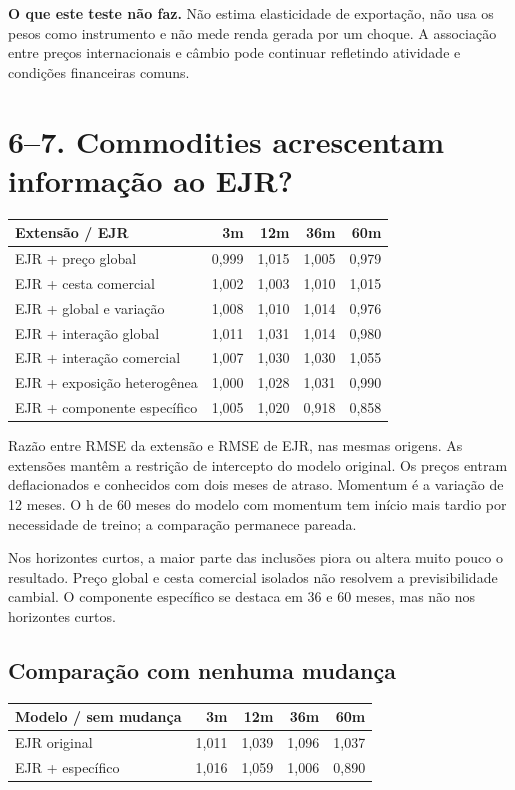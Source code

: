 \documentclass[11pt,a4paper]{article}
\begin{document}
\textbf{O que este teste não faz.} Não estima elasticidade de exportação, não usa os pesos como instrumento e não mede renda gerada por um choque. A associação entre preços internacionais e câmbio pode continuar refletindo atividade e condições financeiras comuns.

\clearpage
\section*{6--7. Commodities acrescentam informação ao EJR?}\small\begin{center}\begin{tabular}{lrrrr}\toprule
Extensão / EJR & 3m & 12m & 36m & 60m \\ \midrule
EJR + preço global & 0,999 & 1,015 & 1,005 & 0,979 \\
EJR + cesta comercial & 1,002 & 1,003 & 1,010 & 1,015 \\
EJR + global e variação & 1,008 & 1,010 & 1,014 & 0,976 \\
EJR + interação global & 1,011 & 1,031 & 1,014 & 0,980 \\
EJR + interação comercial & 1,007 & 1,030 & 1,030 & 1,055 \\
EJR + exposição heterogênea & 1,000 & 1,028 & 1,031 & 0,990 \\
EJR + componente específico & 1,005 & 1,020 & 0,918 & 0,858 \\
\bottomrule\end{tabular}\end{center}\normalsize

Razão entre RMSE da extensão e RMSE de EJR, nas mesmas origens. As extensões mantêm a restrição de intercepto do modelo original. Os preços entram deflacionados e conhecidos com dois meses de atraso. Momentum é a variação de 12 meses. O h de 60 meses do modelo com momentum tem início mais tardio por necessidade de treino; a comparação permanece pareada.

Nos horizontes curtos, a maior parte das inclusões piora ou altera muito pouco o resultado. Preço global e cesta comercial isolados não resolvem a previsibilidade cambial. O componente específico se destaca em 36 e 60 meses, mas não nos horizontes curtos.
\subsection*{Comparação com nenhuma mudança}
\small\begin{center}\begin{tabular}{lrrrr}\toprule
Modelo / sem mudança & 3m & 12m & 36m & 60m \\ \midrule
EJR original & 1,011 & 1,039 & 1,096 & 1,037 \\
EJR + específico & 1,016 & 1,059 & 1,006 & 0,890 \\
\bottomrule\end{tabular}\end{center}\normalsize
\end{document}
